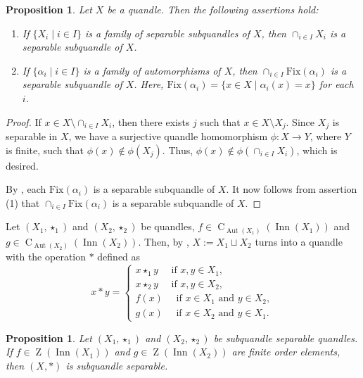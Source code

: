 \documentclass[12pt]{amsart}
\newtheorem{prop}[theorem]{Proposition}
\theoremstyle{definition}
\numberwithin{equation}{subsection}
\newcommand{\Aut}{\operatorname{Aut}}
\newcommand{\C}{\operatorname{C}}
\newcommand{\Inn}{\operatorname{Inn}}
\newcommand{\Z}{\operatorname{Z}}
\newcommand{\Fix}{\mathrm{Fix}}
\begin{document}
\begin{prop}\label{intersectionp of subquandles}
Let $X$ be a quandle. Then the following assertions hold: 
\begin{enumerate}
\item If $\{X_i \mid i \in I \}$ is a family of separable subquandles of $X$, then $\cap_{i \in I}X_i$ is a separable subquandle of $X$.
\item If  $\{ \alpha_i\mid i \in I \}$ is a family of automorphisms of $X$, then $\cap_{i \in I} \Fix(\alpha_i)$ is a separable subquandle of $X$. Here, $\Fix(\alpha_i)= \{x \in X \mid \alpha_i(x)=x \}$ for each $i$.
\end{enumerate}
\end{prop}

\begin{proof}
If $x\in X\setminus \cap_{i \in I}X_i$, then there exists $j$ such that $x\in X\setminus X_j$. Since $X_j$ is separable in $X$, we have a surjective quandle homomorphism $\phi:X\to Y$, where $Y$ is finite, such that $\phi(x)\notin \phi(X_j)$. Thus, $\phi(x)\notin \phi(\cap_{i \in I}X_i)$, which is desired.
\par		
By  \cite[Proposition 6.4]{MR3981139}, each $\Fix(\alpha_i)$ is a separable subquandle of $X$. It now follows from assertion (1) that  $\cap_{i \in I} \Fix(\alpha_i)$  is a separable subquandle of $X$.
\end{proof}


Let $(X_1,\star_1)$ and $(X_2,\star_2)$ be quandles,  $f\in \C_{\Aut(X_1)}(\Inn(X_1))$ and $g\in \C_{\Aut(X_2)}(\Inn(X_2))$. Then, by \cite[Section 9]{MR3948284}, $X:=X_1\sqcup X_2$ turns into a quandle with the operation $\ast$ defined as 
$$x\ast y=\begin{cases}
		x\star_1 y \quad \text{ if } x,y\in X_1,\\
		x \star_2 y \quad \text{ if } x,y\in X_2,\\
		f(x)  \quad \text{ if } x\in X_1 \text{ and } y \in X_2,\\
		g(x) \quad  \text{ if } x\in X_2 \text{ and } y \in X_1.
\end{cases}$$


\begin{prop}\label{twisted union subquandle sep}
Let $(X_1,\star_1)$ and $(X_2,\star_2)$ be subquandle separable quandles. If $f\in \Z(\Inn(X_1))$ and $g\in \Z(\Inn(X_2))$ are finite order elements, then $(X,\ast)$ is subquandle separable.
\end{prop}
\end{document}
